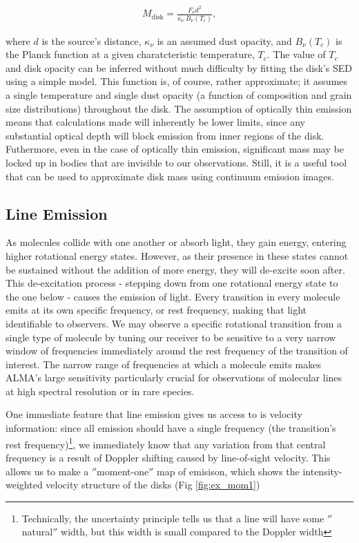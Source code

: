 \begin{align}
M_{\text{disk}} = \frac{F_{\nu} d^2}{\kappa_{\nu}\ B_{\nu}(T_c)},
\end{align}

where $d$ is the source's distance, $\kappa_{\nu}$ is an assumed dust opacity, and $B_{\nu}(T_c)$ is the Planck function at a given charatcteristic temperature, $T_c$. The value of $T_c$ and disk opacity can be inferred without much difficulty by fitting the disk's SED using a simple model. This function is, of course, rather approximate; it assumes a single temperature and single dust opacity (a function of composition and grain size distributions) throughout the disk. The assumption of optically thin emission means that calculations made will inherently be lower limits, since any substantial optical depth will block emission from inner regions of the disk. Futhermore, even in the case of optically thin emission, significant mass may be locked up in bodies that are invisible to our observations. Still, it is a useful tool that can be used to approximate disk mass using continuum emission images.


\subsection{Line Emission}

As molecules collide with one another or absorb light, they gain energy, entering higher rotational energy states. However, as their presence in these states cannot be sustained without the addition of more energy, they will de-excite soon after. This de-excitation process - stepping down from one rotational energy state to the one below - causes the emission of light. Every transition in every molecule emits at its own specific frequency, or rest frequency, making that light identifiable to observers. We may observe a specific rotational transition from a single type of molecule by tuning our receiver to be sensitive to a very narrow window of frequencies immediately around the rest frequency of the transition of interest. The narrow range of frequencies at which a molecule emits makes ALMA's large sensitivity particularly crucial for observations of molecular lines at high spectral resolution or in rare species.

One immediate feature that line emission gives us access to is velocity information: since all emission should have a single frequency (the transition's rest frequency)\footnote{Technically, the uncertainty principle tells us that a line will have some $''$natural$''$ width, but this width is small compared to the Doppler width}, we immediately know that any variation from that central frequency is a result of Doppler shifting caused by line-of-sight velocity. This allows us to make a $''$moment-one$''$ map of emisison, which shows the intensity-weighted velocity structure of the disks (Fig \ref{fig:ex_mom1})


